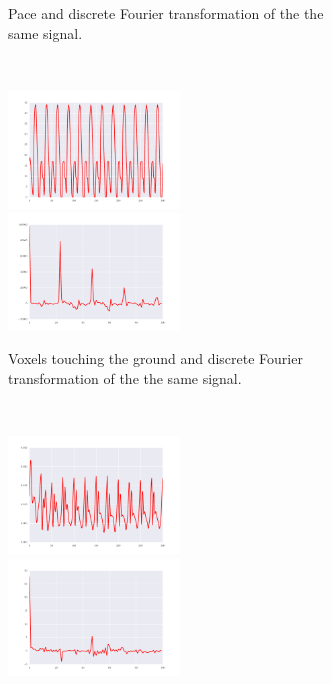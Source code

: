 \documentclass{sig-alternate}
\begin{document}
\begin{figure}[t!]
\begin{subfigure}[t]{0.23\textwidth}
\caption{Pace and discrete Fourier transformation of the the same signal.}
\end{subfigure}~
\begin{subfigure}[t]{0.23\textwidth}
\centering
\includegraphics[width=0.5\textwidth]{../Figures/Behaviors/vtg.pdf}~
\includegraphics[width=0.5\textwidth]{../Figures/Behaviors/vtgdft.pdf}
\caption{Voxels touching the ground and discrete Fourier transformation of the the same signal.}
\end{subfigure}\\
\begin{subfigure}[t]{0.23\textwidth}
\centering
\includegraphics[width=0.5\textwidth]{../Figures/Behaviors/pr.pdf}~
\includegraphics[width=0.5\textwidth]{../Figures/Behaviors/prdft.pdf}

\end{subfigure}
\end{figure}
\end{document}
